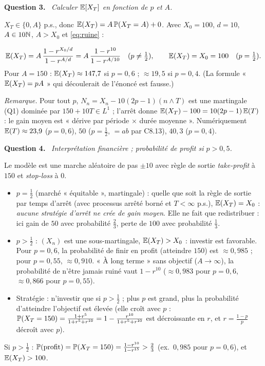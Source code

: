 \documentclass[11pt,a4paper]{article}
\newcommand{\question}[1]{\par\medskip\noindent\textbf{Question #1.}~}
\begin{document}
\begin{exo}
\question{3} \emph{Calculer $\mathbb{E}[X_T]$ en fonction de $p$ et $A$.}

$X_T\in\{0,A\}$ p.s., donc $\mathbb{E}(X_T)=A\,\mathbb{P}(X_T=A)+0$. Avec $X_0=100$, $d=10$, $A\in10\mathbb{N}$, $A>X_0$ et \eqref{eq:ruine} :
\begin{resultat}
\[\mathbb{E}(X_T)=A\,\frac{1-r^{X_0/d}}{1-r^{A/d}}=A\,\frac{1-r^{10}}{1-r^{A/10}}\quad(p\neq\tfrac12),\qquad \mathbb{E}(X_T)=X_0=100\quad(p=\tfrac12).\]
Pour $A=150$ : $\mathbb{E}(X_T)\approx147{,}7$ si $p=0{,}6$ ; $\approx19{,}5$ si $p=0{,}4$. (La formule « $\mathbb{E}(X_T)=pA$ » qui découlerait de
l'énoncé est fausse.)
\end{resultat}
\emph{Remarque.} Pour tout $p$, $N_n=X_n-10(2p-1)(n\wedge T)$ est une martingale (Q1) dominée par $150+10T\in L^1$ ; l'arrêt donne
$\mathbb{E}(X_T)-100=10(2p-1)\,\mathbb{E}(T)$ : le gain moyen est « dérive par période $\times$ durée moyenne ». Numériquement $\mathbb{E}(T)\approx23{,}9$ ($p=0{,}6$),
$50$ ($p=\frac12$, $=ab$ par C8.13), $40{,}3$ ($p=0{,}4$).

\question{4} \emph{Interprétation financière ; probabilité de profit si $p>0{,}5$.}

Le modèle est une marche aléatoire de pas $\pm10$ avec règle de sortie \emph{take-profit} à $150$ et \emph{stop-loss} à $0$.
\begin{itemize}
  \item $p=\frac12$ (marché « équitable », martingale) : quelle que soit la règle de sortie par temps d'arrêt (avec processus arrêté
  borné et $T<\infty$ p.s.), $\mathbb{E}(X_T)=X_0$ : \emph{aucune stratégie d'arrêt ne crée de gain moyen}. Elle ne fait que redistribuer : ici gain de $50$
  avec probabilité $\frac23$, perte de $100$ avec probabilité $\frac13$.
  \item $p>\frac12$ : $(X_n)$ est une sous-martingale, $\mathbb{E}(X_T)>X_0$ : investir est favorable. Pour $p=0{,}6$, la probabilité de
  finir en profit (atteindre $150$) est $\approx0{,}985$ ; pour $p=0{,}55$, $\approx0{,}910$. « À long terme » sans objectif
  ($A\to\infty$), la probabilité de n'être jamais ruiné vaut $1-r^{10}$ ($\approx0{,}983$ pour $p=0{,}6$, $\approx0{,}866$ pour $p=0{,}55$).
  \item Stratégie : n'investir que si $p>\frac12$ ; plus $p$ est grand, plus la probabilité d'atteindre l'objectif est élevée
  (elle croît avec $p$ : $\mathbb{P}(X_T=150)=\frac{1+r^5}{1+r^5+r^{10}}=1-\frac{r^{10}}{1+r^5+r^{10}}$ est décroissante en $r$, et $r=\frac{1-p}{p}$ décroît avec $p$).
\end{itemize}
\begin{resultat}
Si $p>\frac12$ : $\mathbb{P}(\text{profit})=\mathbb{P}(X_T=150)=\frac{1-r^{10}}{1-r^{15}}>\frac23$ (ex.\ $0{,}985$ pour $p=0{,}6$), et $\mathbb{E}(X_T)>100$.
\end{resultat}


\end{exo}
\end{document}
